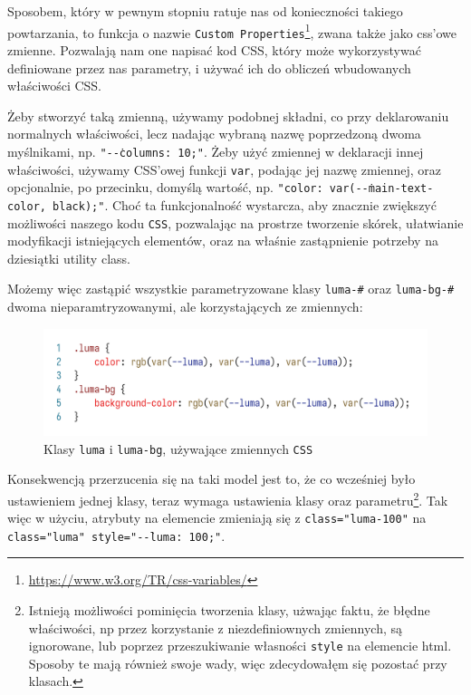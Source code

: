 \documentclass[licencjacka]{pracadypl}
\begin{document}
Sposobem, który w pewnym stopniu ratuje nas od konieczności takiego powtarzania, to funkcja o nazwie \texttt{Custom Properties}\footnote{\url{https://www.w3.org/TR/css-variables/}}, zwana także jako css'owe zmienne. Pozwalają nam one napisać kod CSS, który może wykorzystywać definiowane przez nas parametry, i używać ich do obliczeń wbudowanych właściwości CSS.

Żeby stworzyć taką zmienną, używamy podobnej składni, co przy deklarowaniu normalnych właściwości, lecz nadając wybraną nazwę poprzedzoną dwoma myślnikami, np. \texttt{"-\.-columns: 10;"}. Żeby użyć zmiennej w deklaracji innej właściwości, używamy CSS'owej funkcji \texttt{var}, podając jej nazwę zmiennej, oraz opcjonalnie, po przecinku, domyślą wartość, np. \texttt{"color: var(-\.-main-text-color, black);"}.
Choć ta funkcjonalność wystarcza, aby znacznie zwiększyć możliwości naszego kodu \texttt{CSS}, pozwalając na prostrze tworzenie skórek, ułatwianie modyfikacji istniejących elementów, oraz na właśnie zastąpnienie potrzeby na dziesiątki utility class.

Możemy więc zastąpić wszystkie parametryzowane klasy \texttt{luma-\#} oraz \texttt{luma-bg-\#} dwoma nieparamtryzowanymi, ale korzystających ze zmiennych:

\begin{figure}[H]
  \centering
  \includegraphics[width=\linewidth]{images/code-css-luma-vars.png}
  \caption{Klasy \texttt{luma} i \texttt{luma-bg}, używające zmiennych \texttt{CSS}}
  \label{fig:css-css-luma-vars}
\end{figure}

Konsekwencją przerzucenia się na taki model jest to, że co wcześniej było ustawieniem jednej klasy, teraz wymaga ustawienia klasy oraz parametru\footnote{Istnieją możliwości pominięcia tworzenia klasy, użwając faktu, że błędne właściwości, np przez korzystanie z niezdefiniownych zmiennych, są ignorowane, lub poprzez przeszukiwanie własności \texttt{style} na elemencie html. Sposoby te mają również swoje wady, więc zdecydowałęm się pozostać przy klasach.}. Tak więc w użyciu, atrybuty na elemencie zmieniają się z \texttt{class="luma-100"} na \texttt{class="luma" style="-\.-luma: 100;"}.
\end{document}
